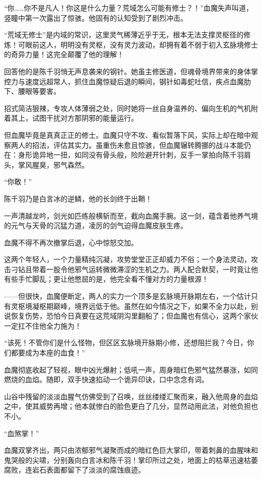 “你……你不是凡人！你这是什么力量？荒域怎么可能有修士？！”血魔失声叫道，竖瞳中第一次露出了惊骇。他固有的认知受到了剧烈冲击。

“荒域无修士”是内域的常识，这里灵气稀薄近乎于无，根本无法支撑灵枢径的修炼！可眼前这人，明明没有灵枢，没有灵力波动，却拥有着不弱于初入玄脉境修士的奇异力量！这完全颠覆了他的理解！

回答他的是陈千羽悄无声息袭来的钢针。她虽主修医道，但魂骨境界带来的身体掌控力与速度远超常人，抓住血魔惊疑后退的瞬间，钢针如毒蛇吐信，疾点血魔肋下、腰眼等要害。

招式简洁狠辣，专攻人体薄弱之处，同时她将一丝自身温养的、偏向生机的气机附着其上，试图干扰对方那阴邪的能量运行。

但血魔毕竟是真真正正的修士。血魔只守不攻、看似暂落下风，实际上却在暗中观察两人的招法，评估其实力。虽重伤未愈且惊骇，但血魔辗转腾挪的战斗本能仍在：身形诡异地一扭，如同没有骨头般，险险避开针刺，反手一掌拍向陈千羽肩头，掌风腥臭，邪气森然。

“你敢！”

陈千羽乃是白言冰的逆鳞，他的长剑终于出鞘！

一声清越龙吟，剑光如匹练般横斩而至，截向血魔手腕。这一剑，蕴含着他养气境的元气与天骨的沉猛力道，凌厉的剑气迫得血魔皮肤生疼。

血魔不得不再次撤掌后退，心中惊怒交加。

这两个年轻人，一个力量精纯沉凝，攻势堂堂正正却威力不俗；一个身法灵动，攻击刁钻且带着一股令他邪气运转微微滞涩的生机之力。两人配合默契，一时竟让他有些手忙脚乱；更让他憋屈的是，他完全看不懂对方的力量根源！

——但很快，血魔便断定，两人的实力一个顶多是玄脉境开脉期左右，一个估计只有灵枢境凝枢期巅峰，境界远低于他。虽然在如今情况之下，如果不全力以赴，别说恢复伤势，恐怕今日真要在这荒域阴沟里翻船了；但血魔也有信心，这两个家伙一定扛不住他全力施为！

“该死！不管你们是什么怪物，但区区玄脉境开脉期小修，还想阻拦我？今日，你们都要成为本座的血食！”

血魔彻底收起了轻视，眼中凶光爆射；低吼一声，周身暗红色邪气猛然暴涨，如同燃烧的血焰。随即，双手快速掐动一个诡异印诀，口中念念有词。

山谷中残留的淡淡血腥气仿佛受到了召唤，丝丝缕缕汇聚而来，融入他周身的血焰之中，使其威势再增；他本就惨白的脸色更白了几分，显然动用此法，对他负担也不小。

“血煞掌！”

血魔双掌齐出，两只由浓郁邪气凝聚而成的暗红色巨大掌印，带着刺鼻的血腥味和鬼哭般的尖啸，分别轰向白言冰和陈千羽！掌印所过之处，地面上的枯草迅速枯萎腐败，连岩石表面都留下了淡淡的腐蚀痕迹。

